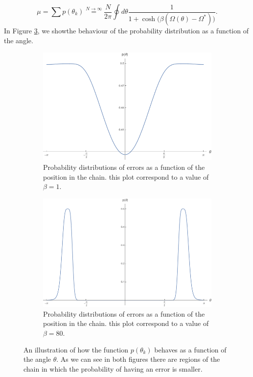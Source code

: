 \begin{equation}
\mu = \sum p(\theta_k) \stackrel{N\to \infty}{=}\frac{N}{2\pi}\oint d\theta \frac{1}{1+\cosh{(\beta(\Omega(\theta)-\Omega^*)})}.
   \label{CH3:average_of_errors}
\end{equation}
In Figure \ref{CH3:examples_of_probability_distribution_errors}, we showthe behaviour of the probability distribution as a function of the angle. 
\begin{figure}[H]
\centering
\begin{subfigure}[b]{0.47\textwidth}
    \centering
    \includegraphics[width = \textwidth]{Figures/beta_1.png}
    \caption{Probability distributions of errors as a function of the position in the chain. this plot correspond to a value of $\beta=1$.}
    \label{beta1}
\end{subfigure}
\hfill
\begin{subfigure}[b]{0.47\textwidth}
    \centering
    \includegraphics[width = \textwidth]{Figures/beta_80.png}
    \caption{Probability distributions of errors as a function of the position in the chain. this plot correspond to a value of $\beta=80$.}
    \label{beta80}
\end{subfigure}
\caption{An illustration of how the function $p(\theta_k)$ behaves as a function of the angle $\theta$. As we can see in both figures there are regions of the chain in which the probability of having an error is smaller.}
       \label{CH3:examples_of_probability_distribution_errors}
\end{figure}

